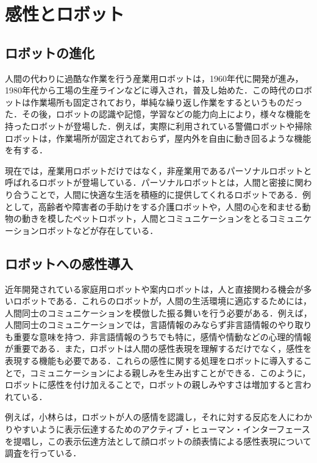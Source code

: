 \newpage

\section{感性とロボット}
\label{sec2.3}

\subsection{ロボットの進化}
\label{sec2.3.1}

人間の代わりに過酷な作業を行う産業用ロボットは，1960年代に開発が進み，1980年代から工場の生産ラインなどに導入され，普及し始めた．この時代のロボットは作業場所も固定されており，単純な繰り返し作業をするというものだった．その後，ロボットの認識や記憶，学習などの能力向上により，様々な機能を持ったロボットが登場した．例えば，実際に利用されている警備ロボットや掃除ロボットは，作業場所が固定されておらず，屋内外を自由に動き回るような機能を有する．

現在では，産業用ロボットだけではなく，非産業用であるパーソナルロボットと呼ばれるロボットが登場している．パーソナルロボットとは，人間と密接に関わり合うことで，人間に快適な生活を積極的に提供してくれるロボットである\cite{perso}．例として，高齢者や障害者の手助けをする介護ロボットや，人間の心を和ませる動物の動きを模したペットロボット，人間とコミュニケーションをとるコミュニケーションロボットなどが存在している．




\subsection{ロボットへの感性導入}
\label{sec2.3.2}

近年開発されている家庭用ロボットや案内ロボットは，人と直接関わる機会が多いロボットである．これらのロボットが，人間の生活環境に適応するためには，人間同士のコミュニケーションを模倣した振る舞いを行う必要がある．例えば，人間同士のコミュニケーションでは，言語情報のみならず非言語情報のやり取りも重要な意味を持つ\cite{gengo}．非言語情報のうちでも特に，感情や情動などの心理的情報が重要である．また，ロボットは人間の感性表現を理解するだけでなく，感性を表現する機能も必要である．これらの感性に関する処理をロボットに導入することで，コミュニケーションによる親しみを生み出すことができる．このように，ロボットに感性を付け加えることで，ロボットの親しみやすさは増加すると言われている．

例えば，小林らは，ロボットが人の感情を認識し，それに対する反応を人にわかりやすいように表示伝達するためのアクティブ・ヒューマン・インターフェースを提唱し，この表示伝達方法として顔ロボットの顔表情による感性表現について調査を行っている\cite{gengo}．




